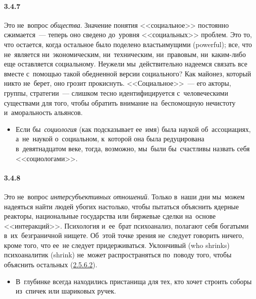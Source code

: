 \paragraph{3.4.7}\hypertarget{par:3.4.7}{} Это не~вопрос {\itshape общества}. Значение понятия <<социальное>> постоянно сжимается~--- теперь оно сведено до~уровня <<социальных>> проблем. Это то, что остается, когда остальное было поделено властьимущими (powerful); все, что не~является ни~экономическим, ни~техническим, ни~правовым, ни~каким-либо еще оставляется социальному. Неужели мы~действительно надеемся связать все вместе с~помощью такой обедненной версии социального? Как майонез, который никто не~берет, оно грозит прокиснуть. <<Социальное>>~--- его акторы, группы, стратегии~--- слишком тесно идентифицируется с~человеческими существами для того, чтобы обратить внимание на~беспомощную нечистоту и~аморальность альянсов.
	\begin{itemize}
	\item 
	Если бы~{\itshape социология} (как подсказывает ее~имя) была наукой об~ассоциациях, а~не~наукой о~социальном, к~которой она была редуцирована в~девятнадцатом веке, тогда, возможно, мы~были бы~счастливы назвать себя <<социологами>>.
	\end{itemize}

\paragraph{3.4.8}\hypertarget{par:3.4.8}{} Это не~вопрос {\itshape интерсубъективных отношений}. Только в~наши дни мы~можем надеяться найти людей убогих настолько, чтобы пытаться объяснить ядерные реакторы, национальные государства или биржевые сделки на~основе <<интеракций>>. Психология и~ее~брат психоанализ, полагают себя богатыми в~их~безграничной нищете. Об~этой точке зрения не~следует говорить ничего, кроме того, что ее~не следует придерживаться. Уклончивый (who shrinks) психоаналитик (shrink) не~может распространяться по~поводу того, чтобы объяснить остальных (\hyperlink{par:2.5.6.2}{2.5.6.2}).
	\begin{itemize}
	\item 
 В~глубинке всегда находились пристанища для тех, кто хочет строить соборы из~спичек или шариковых ручек.
	\end{itemize}

